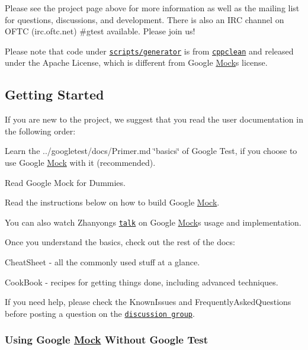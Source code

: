Please see the project page above for more information as well as the mailing list for questions, discussions, and development. There is also an I\+RC channel on O\+F\+TC (irc.\+oftc.\+net) \#gtest available. Please join us!

Please note that code under \href{scripts/generator/}{\tt scripts/generator} is from \href{http://code.google.com/p/cppclean/}{\tt cppclean} and released under the Apache License, which is different from Google \hyperlink{class_mock}{Mock}\textquotesingle{}s license.

\subsection*{Getting Started}

If you are new to the project, we suggest that you read the user documentation in the following order\+:


\begin{DoxyItemize}
\item Learn the ../googletest/docs/\+Primer.md \char`\"{}basics\char`\"{} of Google Test, if you choose to use Google \hyperlink{class_mock}{Mock} with it (recommended).
\item Read Google Mock for Dummies.
\item Read the instructions below on how to build Google \hyperlink{class_mock}{Mock}.
\end{DoxyItemize}

You can also watch Zhanyong\textquotesingle{}s \href{http://www.youtube.com/watch?v=sYpCyLI47rM}{\tt talk} on Google \hyperlink{class_mock}{Mock}\textquotesingle{}s usage and implementation.

Once you understand the basics, check out the rest of the docs\+:


\begin{DoxyItemize}
\item Cheat\+Sheet -\/ all the commonly used stuff at a glance.
\item Cook\+Book -\/ recipes for getting things done, including advanced techniques.
\end{DoxyItemize}

If you need help, please check the Known\+Issues and Frequently\+Asked\+Questions before posting a question on the \href{http://groups.google.com/group/googlemock}{\tt discussion group}.

\subsubsection*{Using Google \hyperlink{class_mock}{Mock} Without Google Test}

